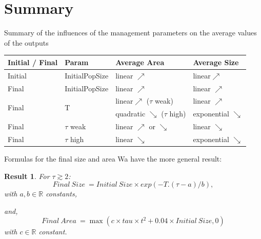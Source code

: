 \documentclass{myBeamer}
\newcommand{\R}{\mathbb R}%
\newtheorem{Resu}[Prop]{Result}
\begin{document}
\section*{Summary}

\begin{frame}{
Summary of the influences of the management parameters on the average values of the outputs
}


\renewcommand{\arraystretch}{1.8}
\begin{tabular}{|l|l|l|l|}
	\hline
   Initial / Final   &   Param   			&  Average Area   & Average Size   \\  
   	\hline
    Initial  &    InitialPopSize		&     linear $\nearrow$      &     linear$\nearrow$    \\
	\hline	    
    Final &   InitialPopSize	& linear   $\nearrow$  &   linear $\nearrow$\\
	\hline	        
	 \multirow{2}{*}{Final} &  \multirow{2}{*}{T}  &  linear$\nearrow$ ($\tau$ weak)   & linear $\nearrow$  \\
 \cline{3-4} 
	& &  quadratic  $\searrow$	 ($\tau$ high) & exponential $\searrow$ \\
	\hline    
    Final &   $\tau$ 	weak &    linear $\nearrow$ or $\searrow$	&  linear $\searrow$  \\
    Final &   $\tau$ 	high   &   linear $\searrow$	&  exponential  $\searrow$  \\
     \hline
     
\end{tabular}

%
\end{frame}


\begin{frame}{Formulas for the  final size and area}
Wa have the more general result:
\begin{Resu}
For $\tau \gtrsim 2$:
\[  Final ~  Size ~ = Initial ~ Size \times exp(- T  .( \tau - a)/b ), \] with $a,b \in \R$ constants,

\bigbreak 
and,
\[ Final ~  Area ~ = \max( c \times tau \times t^2 + 0.04 \times Initial ~ Size , 0)\]  with $c \in \R$ constant. 

\end{Resu} 


\end{frame}
\end{document}
